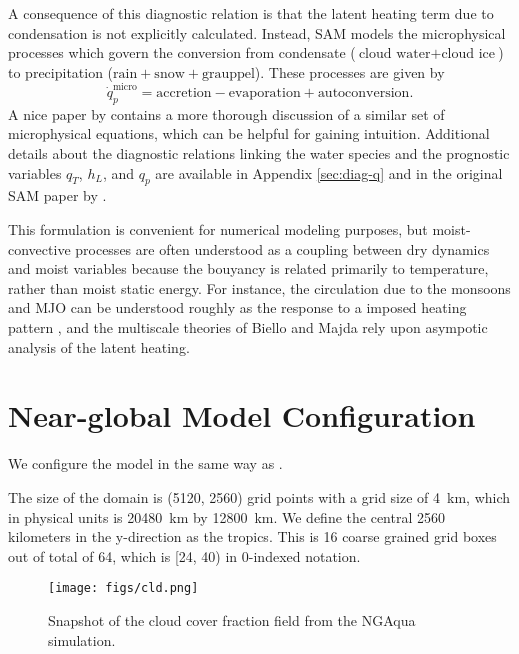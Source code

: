 \documentclass{report}
\begin{document}
A consequence of this diagnostic relation is that the latent
heating term due to condensation is not explicitly calculated. Instead, SAM
models the microphysical processes which govern the conversion from condensate
($\text{cloud water} + \text{cloud ice}$) to precipitation ($\text{rain} +
\text{snow} + \text{grauppel}$). These processes are given by
\[
  \dot{q}_p^{\text{micro}} = \text{accretion} - \text{evaporation} + \text{autoconversion}.
\]
A nice paper by \textcite{hernandez-duenas_minimal_2013} contains a more thorough
discussion of a similar set of microphysical equations, which can be helpful for
gaining intuition. Additional details about the diagnostic relations linking the
water species and the prognostic variables $q_T$, $h_L$, and $q_p$ are available
in Appendix \ref{sec:diag-q} and in the original SAM paper by \textcite{Khairoutdinov2003}.

This formulation is convenient for numerical modeling purposes, but
moist-convective processes are often understood as a coupling between dry
dynamics and moist variables because the bouyancy is related primarily to
temperature, rather than moist static energy.
For instance, the circulation due to the monsoons and MJO can be understood
roughly as the response to a imposed heating pattern \autocite{Gill1980}, and
the multiscale theories of Biello and Majda rely upon asympotic analysis of the
latent heating.

\section{Near-global Model Configuration}
\label{sec:model-config}

We configure the model in the same way as \textcite{Bretherton2015}. 

The size of the domain is (5120, 2560) grid points with a grid size of
\SI{4}{\km}, which in physical units is \SI{20480}{\km} by \SI{12800}{\km}.
We define the central 2560 kilometers in the y-direction as the tropics. 
This is 16 coarse grained grid boxes out of total of 64, which is [24, 40) in
0-indexed notation.

\begin{figure}[ht]
  \centering
  \texttt{[image: figs/cld.png]}
  \caption{\label{fig:cld}Snapshot of the cloud cover fraction field from the NGAqua simulation.}
\end{figure}

\end{document}

